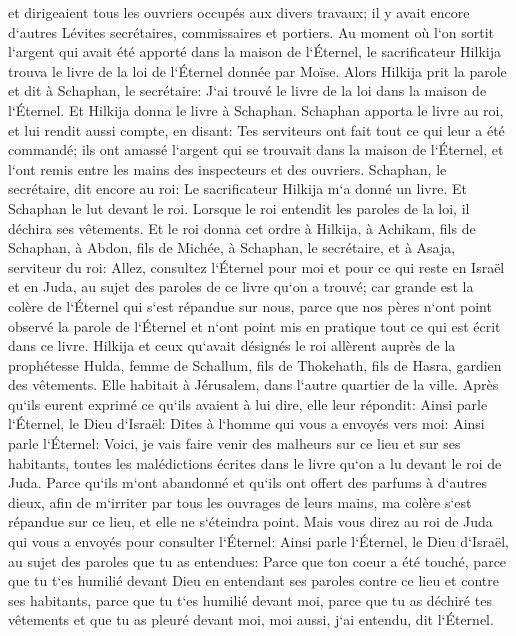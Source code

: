 \verse et dirigeaient tous les ouvriers occupés aux divers travaux; il y avait encore d`autres Lévites secrétaires, commissaires et portiers. 
\verse Au moment où l`on sortit l`argent qui avait été apporté dans la maison de l`Éternel, le sacrificateur Hilkija trouva le livre de la loi de l`Éternel donnée par Moïse. 
\verse Alors Hilkija prit la parole et dit à Schaphan, le secrétaire: J`ai trouvé le livre de la loi dans la maison de l`Éternel. Et Hilkija donna le livre à Schaphan. 
\verse Schaphan apporta le livre au roi, et lui rendit aussi compte, en disant: Tes serviteurs ont fait tout ce qui leur a été commandé; 
\verse ils ont amassé l`argent qui se trouvait dans la maison de l`Éternel, et l`ont remis entre les mains des inspecteurs et des ouvriers. 
\verse Schaphan, le secrétaire, dit encore au roi: Le sacrificateur Hilkija m`a donné un livre. Et Schaphan le lut devant le roi. 
\verse Lorsque le roi entendit les paroles de la loi, il déchira ses vêtements. 
\verse Et le roi donna cet ordre à Hilkija, à Achikam, fils de Schaphan, à Abdon, fils de Michée, à Schaphan, le secrétaire, et à Asaja, serviteur du roi: 
\verse Allez, consultez l`Éternel pour moi et pour ce qui reste en Israël et en Juda, au sujet des paroles de ce livre qu`on a trouvé; car grande est la colère de l`Éternel qui s`est répandue sur nous, parce que nos pères n`ont point observé la parole de l`Éternel et n`ont point mis en pratique tout ce qui est écrit dans ce livre. 
\verse Hilkija et ceux qu`avait désignés le roi allèrent auprès de la prophétesse Hulda, femme de Schallum, fils de Thokehath, fils de Hasra, gardien des vêtements. Elle habitait à Jérusalem, dans l`autre quartier de la ville. Après qu`ils eurent exprimé ce qu`ils avaient à lui dire, 
\verse elle leur répondit: Ainsi parle l`Éternel, le Dieu d`Israël: Dites à l`homme qui vous a envoyés vers moi: 
\verse Ainsi parle l`Éternel: Voici, je vais faire venir des malheurs sur ce lieu et sur ses habitants, toutes les malédictions écrites dans le livre qu`on a lu devant le roi de Juda. 
\verse Parce qu`ils m`ont abandonné et qu`ils ont offert des parfums à d`autres dieux, afin de m`irriter par tous les ouvrages de leurs mains, ma colère s`est répandue sur ce lieu, et elle ne s`éteindra point. 
\verse Mais vous direz au roi de Juda qui vous a envoyés pour consulter l`Éternel: Ainsi parle l`Éternel, le Dieu d`Israël, au sujet des paroles que tu as entendues: 
\verse Parce que ton coeur a été touché, parce que tu t`es humilié devant Dieu en entendant ses paroles contre ce lieu et contre ses habitants, parce que tu t`es humilié devant moi, parce que tu as déchiré tes vêtements et que tu as pleuré devant moi, moi aussi, j`ai entendu, dit l`Éternel. 
